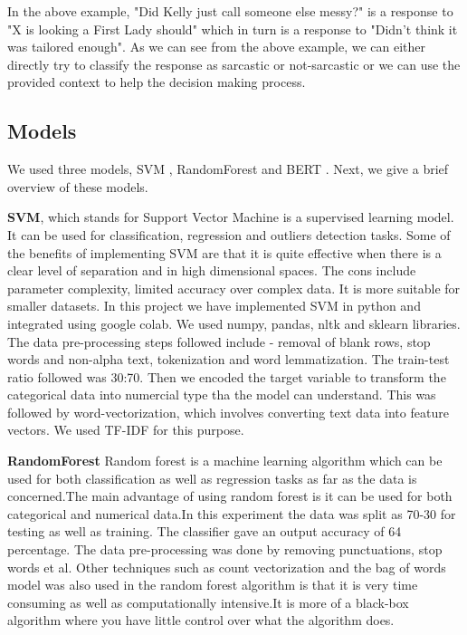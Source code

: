\documentclass[10pt,twocolumn,letterpaper]{article}
\begin{document}
In the above example, "Did Kelly just call someone else messy?" is a response to "X is looking a First Lady should" which in turn is a response to "Didn't think it was tailored enough". As we can see from the above example, we can either directly try to classify the response as sarcastic or not-sarcastic or we can use the provided context to help the decision making process.

\subsection{Models}
We used three models, SVM \cite{paper_13}, RandomForest \cite{paper_14} and BERT \cite{paper_01}. Next, we give a brief overview of these models.

\textbf{SVM}, which stands for Support Vector Machine is a supervised learning model. It can be used for classification, regression and outliers detection tasks. Some of the benefits of implementing SVM are that it is quite effective when there is a clear level of separation and in high dimensional spaces. The cons include parameter complexity, limited accuracy over complex data. It is more suitable for smaller datasets. In this project we have  implemented SVM in python and integrated using google colab. We used numpy, pandas, nltk and sklearn libraries. The data pre-processing steps followed include - removal of blank rows, stop words and non-alpha text, tokenization and word lemmatization. The train-test ratio followed was 30:70. Then we encoded the target variable to transform the categorical data into numercial type tha the model can understand. This was followed by word-vectorization, which involves converting text data into feature vectors. We used TF-IDF for this purpose. 


\textbf{RandomForest} Random forest is a machine learning algorithm which can be used for both classification as well as regression tasks as far as the data is concerned.The main advantage of using random forest is it can be used for both categorical and numerical data.In this experiment the data was split as 70-30 for testing as well as training. The classifier gave an output accuracy of 64 percentage. The data pre-processing was done by removing punctuations, stop words et al. Other techniques such as count vectorization and the bag of words model was also used in the random forest algorithm is that it is very time consuming as well as computationally intensive.It is more of a black-box algorithm where you have little control over what the algorithm does.
\end{document}
